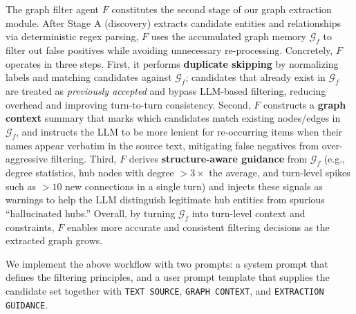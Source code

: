 The graph filter agent $F$ constitutes the second stage of our graph extraction module. After Stage A (discovery) extracts candidate entities and relationships via deterministic regex parsing, $F$ uses the accumulated graph memory $\mathcal{G}_f$ to filter out false positives while avoiding unnecessary re-processing. Concretely, $F$ operates in three steps. First, it performs \textbf{duplicate skipping} by normalizing labels and matching candidates against $\mathcal{G}_f$; candidates that already exist in $\mathcal{G}_f$ are treated as \emph{previously accepted} and bypass LLM-based filtering, reducing overhead and improving turn-to-turn consistency. Second, $F$ constructs a \textbf{graph context} summary that marks which candidates match existing nodes/edges in $\mathcal{G}_f$, and instructs the LLM to be more lenient for re-occurring items when their names appear verbatim in the source text, mitigating false negatives from over-aggressive filtering. Third, $F$ derives \textbf{structure-aware guidance} from $\mathcal{G}_f$ (e.g., degree statistics, hub nodes with degree $>3\times$ the average, and turn-level spikes such as $>10$ new connections in a single turn) and injects these signals as warnings to help the LLM distinguish legitimate hub entities from spurious “hallucinated hubs.” Overall, by turning $\mathcal{G}_f$ into turn-level context and constraints, $F$ enables more accurate and consistent filtering decisions as the extracted graph grows.

We implement the above workflow with two prompts: a system prompt that defines the filtering principles, and a user prompt template that supplies the candidate set together with \texttt{TEXT SOURCE}, \texttt{GRAPH CONTEXT}, and \texttt{EXTRACTION GUIDANCE}.

